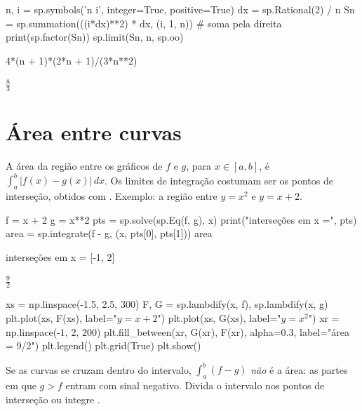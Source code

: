 \begin{entrada}
n, i = sp.symbols('n i', integer=True, positive=True)
dx = sp.Rational(2) / n
Sn = sp.summation(((i*dx)**2) * dx, (i, 1, n))       # soma pela direita
print(sp.factor(Sn))
sp.limit(Sn, n, sp.oo)
\end{entrada}
\begin{saida}
4*(n + 1)*(2*n + 1)/(3*n**2)
\end{saida}
\begin{saidamat}
$\displaystyle \frac{8}{3}$
\end{saidamat}

\section{Área entre curvas}

A área da região entre os gráficos de $f$ e $g$, para $x\in[a,b]$, é $\int_a^b |f(x)-g(x)|\,dx$. Os limites de
integração costumam ser os pontos de interseção, obtidos com . Exemplo: a região entre $y=x^2$ e $y=x+2$.

\begin{entrada}
f = x + 2
g = x**2
pts = sp.solve(sp.Eq(f, g), x)
print("interseções em x =", pts)
area = sp.integrate(f - g, (x, pts[0], pts[1]))
area
\end{entrada}
\begin{saida}
interseções em x = [-1, 2]
\end{saida}
\begin{saidamat}
$\displaystyle \frac{9}{2}$
\end{saidamat}

\begin{entrada}
xs = np.linspace(-1.5, 2.5, 300)
F, G = sp.lambdify(x, f), sp.lambdify(x, g)
plt.plot(xs, F(xs), label="$y=x+2$")
plt.plot(xs, G(xs), label="$y=x^2$")
xr = np.linspace(-1, 2, 200)
plt.fill_between(xr, G(xr), F(xr), alpha=0.3, label="área = 9/2")
plt.legend()
plt.grid(True)
plt.show()
\end{entrada}

\begin{atencao}
Se as curvas se cruzam dentro do intervalo, $\int_a^b (f-g)$ \emph{não} é a área: as partes em que $g>f$ entram
com sinal negativo. Divida o intervalo nos pontos de interseção ou integre .
\end{atencao}


